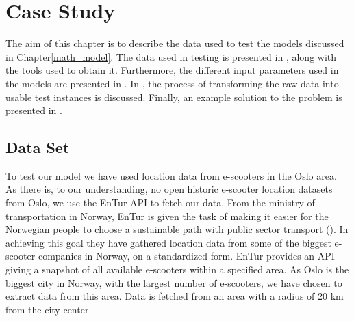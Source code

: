 \chapter{Case Study}\label{case_study}

The aim of this chapter is to describe the data used to test the models discussed in Chapter\ref{math_model}. The data used in testing is presented in , along with the tools used to obtain it. Furthermore, the different input parameters used in the models are presented in . In , the process of transforming the raw data into usable test instances is discussed. Finally, an example solution to the problem is presented in .

\section{Data Set}\label{data_set}
To test our model we have used location data from e-scooters in the Oslo area. As there is, to our understanding, no open historic e-scooter location datasets from Oslo, we use the EnTur API to fetch our data. From the ministry of transportation in Norway, EnTur is given the task of making it easier for the Norwegian people to choose a sustainable path with public sector transport (\cite{noauthor_enturno_nodate}). In achieving this goal they have gathered location data from some of the biggest e-scooter companies in Norway, on a standardized form. EnTur provides an API giving a snapshot of all available e-scooters within a specified area. As Oslo is the biggest city in Norway, with the largest number of e-scooters, we have chosen to extract data from this area. Data is fetched from an area with a radius of 20 km from the city center.

